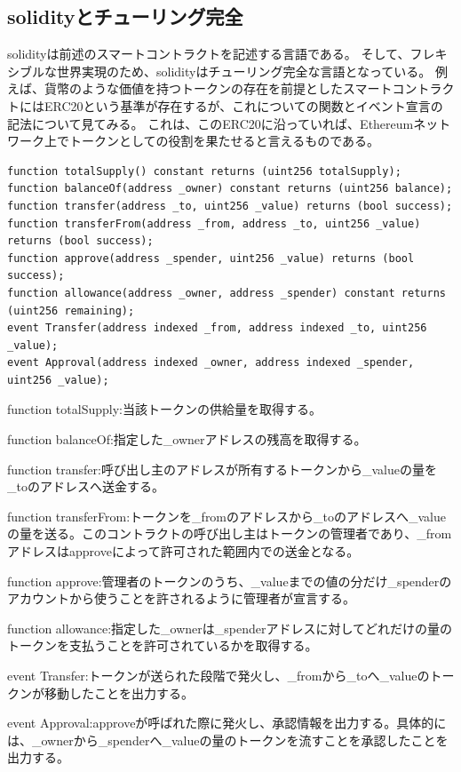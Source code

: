 \subsection{solidityとチューリング完全}
solidityは前述のスマートコントラクトを記述する言語である。
そして、フレキシブルな世界実現のため、solidityはチューリング完全な言語となっている。
例えば、貨幣のような価値を持つトークンの存在を前提としたスマートコントラクトにはERC20という基準が存在するが、これについての関数とイベント宣言の記法について見てみる。
これは、このERC20に沿っていれば、Ethereumネットワーク上でトークンとしての役割を果たせると言えるものである。
\begin{lstlisting}[caption=ERC20を満たすために必要な関数とイベントの宣言文,label=ERC20-criteria]
function totalSupply() constant returns (uint256 totalSupply);
function balanceOf(address _owner) constant returns (uint256 balance);
function transfer(address _to, uint256 _value) returns (bool success);
function transferFrom(address _from, address _to, uint256 _value) returns (bool success);
function approve(address _spender, uint256 _value) returns (bool success);
function allowance(address _owner, address _spender) constant returns (uint256 remaining);
event Transfer(address indexed _from, address indexed _to, uint256 _value);
event Approval(address indexed _owner, address indexed _spender, uint256 _value);
\end{lstlisting}
\begin{list}{}{}
\item function totalSupply:当該トークンの供給量を取得する。
\item function balanceOf:指定した\_ownerアドレスの残高を取得する。
\item function transfer:呼び出し主のアドレスが所有するトークンから\_valueの量を\_toのアドレスへ送金する。
\item function transferFrom:トークンを\_fromのアドレスから\_toのアドレスへ\_valueの量を送る。このコントラクトの呼び出し主はトークンの管理者であり、\_fromアドレスはapproveによって許可された範囲内での送金となる。
\item function approve:管理者のトークンのうち、\_valueまでの値の分だけ\_spenderのアカウントから使うことを許されるように管理者が宣言する。
\item function allowance:指定した\_ownerは\_spenderアドレスに対してどれだけの量のトークンを支払うことを許可されているかを取得する。
\item event Transfer:トークンが送られた段階で発火し、\_fromから\_toへ\_valueのトークンが移動したことを出力する。
\item event Approval:approveが呼ばれた際に発火し、承認情報を出力する。具体的には、\_ownerから\_spenderへ\_valueの量のトークンを流すことを承認したことを出力する。
\end{list}
